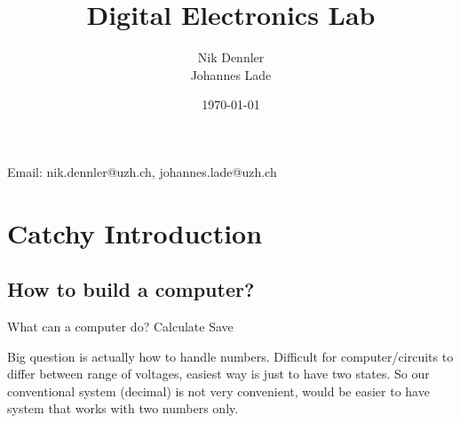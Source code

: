 \documentclass[10pt,a4paper]{article}
\author{Nik Dennler \\ Johannes Lade}
\title{Digital Electronics Lab}
\date{\today{}}
\begin{document}
	
\begin{titlepage}
	\maketitle
		\begin{center}
			Email: nik.dennler@uzh.ch, johannes.lade@uzh.ch
		\end{center}
	\thispagestyle{empty}
\end{titlepage}




\tableofcontents
\newpage

\section{Catchy Introduction}
\subsection{How to build a computer?}
What can a computer do?
Calculate
Save

Big question is actually how to handle numbers. Difficult for computer/circuits to differ between range of voltages, easiest way is just to have two states. So our conventional system (decimal) is not very convenient, would be easier to have system that works with two numbers only. 




%
%

\end{document}
